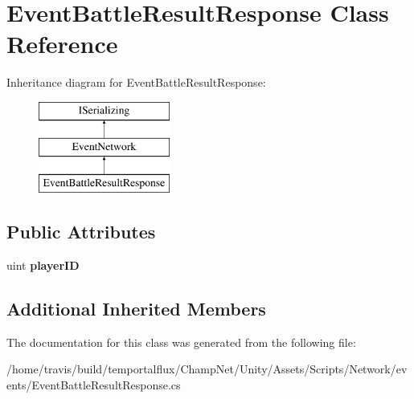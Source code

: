 \hypertarget{class_event_battle_result_response}{\section{Event\-Battle\-Result\-Response Class Reference}
\label{class_event_battle_result_response}
}
Inheritance diagram for Event\-Battle\-Result\-Response\-:\begin{figure}[H]
\begin{center}
\leavevmode
\includegraphics[height=3.000000cm]{class_event_battle_result_response}
\end{center}
\end{figure}
\subsection*{Public Attributes}
\begin{DoxyCompactItemize}
\item 
\hypertarget{class_event_battle_result_response_ada6f86b445a765ab55896a2f97a688bb}{uint {\bfseries player\-I\-D}}\label{class_event_battle_result_response_ada6f86b445a765ab55896a2f97a688bb}

\end{DoxyCompactItemize}
\subsection*{Additional Inherited Members}


The documentation for this class was generated from the following file\-:\begin{DoxyCompactItemize}
\item 
/home/travis/build/temportalflux/\-Champ\-Net/\-Unity/\-Assets/\-Scripts/\-Network/events/Event\-Battle\-Result\-Response.\-cs\end{DoxyCompactItemize}
